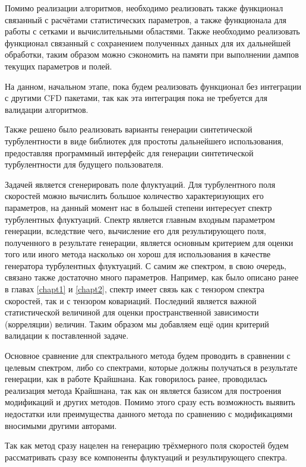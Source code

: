 Помимо реализации алгоритмов, необходимо реализовать также функционал связанный с расчётами статистических параметров, а также функционала для работы с сетками и вычислительными областями. Также необходимо реализовать функционал связанный с сохранением полученных данных для их дальнейшей обработки, таким образом можно сэкономить на памяти при выполнении дампов текущих параметров и полей. 

На данном, начальном этапе, пока будем реализовать функционал без интеграции с другими CFD пакетами, так как эта интеграция пока не требуется для валидации алгоритмов.

Также решено было реализовать варианты генерации синтетической турбулентности в виде библиотек для простоты дальнейшего использования, предоставляя программный интерфейс для генерации синтетической турбулентности для будущего пользователя. 

%
%
Задачей является сгенерировать поле флуктуаций. Для турбулентного поля скоростей можно вычислить большое количество характеризующих его параметров, на данный момент нас в большей степени интересует спектр турбулентных флуктуаций. Спектр является главным входным параметром генерации, вследствие чего, вычисление его для результирующего поля, полученного в результате генерации, является основным критерием для оценки того или иного метода насколько он хорош для использования в качестве генератора турбулентных флуктуаций. С самим же спектром, в свою очередь, связано также достаточно много параметров. Например, как было описано ранее в главах \ref{chapt1} и \ref{chapt2}, спектр имеет связь как с тензором спектра скоростей, так и с тензором ковариаций. Последний является важной статистической величиной для оценки пространственной зависимости (корреляции) величин. Таким образом мы добавляем ещё один критерий валидации к поставленной задаче. 

Основное сравнение для спектрального метода будем проводить в сравнении с целевым спектром, либо со спектрами, которые должны получаться в результате генерации, как в работе Крайшнана. Как говорилось ранее, проводилась реализация метода Крайшнана, так как он является базисом для построения модификаций и других методов. Помимо этого сразу есть возможность выявить недостатки или преимущества данного метода по сравнению с модификациями вносимыми другими авторами. 

Так как метод сразу нацелен на генерацию трёхмерного поля скоростей будем рассматривать сразу все компоненты флуктуаций и результирующего спектра. 

